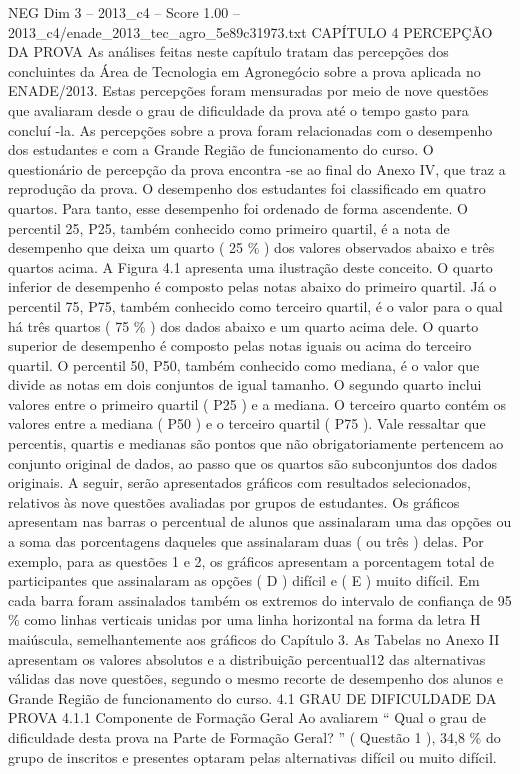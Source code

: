 \begin{textsample}{NEG Dim 3 – 2013\_c4 – Score 1.00 – 2013\_c4/enade\_2013\_tec\_agro\_5e89c31973.txt}  \label{ex:f3_neg_141}
CAPÍTULO 4 PERCEPÇÃO DA PROVA As análises feitas neste capítulo tratam das percepções dos concluintes da Área de Tecnologia em Agronegócio sobre a prova aplicada no ENADE/2013.
Estas percepções foram mensuradas por meio de nove questões que avaliaram desde o grau de dificuldade da prova até o tempo gasto para concluí -la.
As percepções sobre a prova foram relacionadas com o desempenho dos estudantes e com a Grande Região de funcionamento do curso.
O questionário de percepção da prova encontra -se ao final do Anexo IV, que traz a reprodução da prova.
O desempenho dos estudantes foi classificado em quatro quartos.
Para tanto, esse desempenho foi ordenado de forma ascendente.
O percentil 25, P25, também conhecido como primeiro quartil, é a nota de desempenho que deixa um quarto ( 25 \% ) dos valores observados abaixo e três quartos acima.
A Figura 4.1 apresenta uma ilustração deste conceito.
O quarto inferior de desempenho é composto pelas notas abaixo do primeiro quartil.
Já o percentil 75, P75, também conhecido como terceiro quartil, é o valor para o qual há três quartos ( 75 \% ) dos dados abaixo e um quarto acima dele.
O quarto superior de desempenho é composto pelas notas iguais ou acima do terceiro quartil.
O percentil 50, P50, também conhecido como mediana, é o valor que divide as notas em dois conjuntos de igual tamanho.
O segundo quarto inclui valores entre o primeiro quartil ( P25 ) e a mediana.
O terceiro quarto contém os valores entre a mediana ( P50 ) e o terceiro quartil ( P75 ).
Vale ressaltar que percentis, quartis e medianas são pontos que não obrigatoriamente pertencem ao conjunto original de dados, ao passo que os quartos são subconjuntos dos dados originais.
A seguir, serão apresentados gráficos com resultados selecionados, relativos às nove questões avaliadas por grupos de estudantes.
Os gráficos apresentam nas barras o percentual de alunos que assinalaram uma das opções ou a soma das porcentagens daqueles que assinalaram duas ( ou três ) delas.
Por exemplo, para as questões 1 e 2, os gráficos apresentam a porcentagem total de participantes que assinalaram as opções ( D ) difícil e ( E ) muito difícil.
Em cada barra foram assinalados também os extremos do intervalo de confiança de 95 \% como linhas verticais unidas por uma linha horizontal na forma da letra H maiúscula, semelhantemente aos gráficos do Capítulo 3.
As Tabelas no Anexo II apresentam os valores absolutos e a distribuição percentual12 das alternativas válidas das nove questões, segundo o mesmo recorte de desempenho dos alunos e Grande Região de funcionamento do curso. 4.1 GRAU DE DIFICULDADE DA PROVA 4.1.1 Componente de Formação Geral Ao avaliarem “ Qual o grau de dificuldade desta prova na Parte de Formação Geral? ” ( Questão 1 ), 34,8 \% do grupo de inscritos e presentes optaram pelas alternativas difícil ou muito difícil.

\end{textsample}
